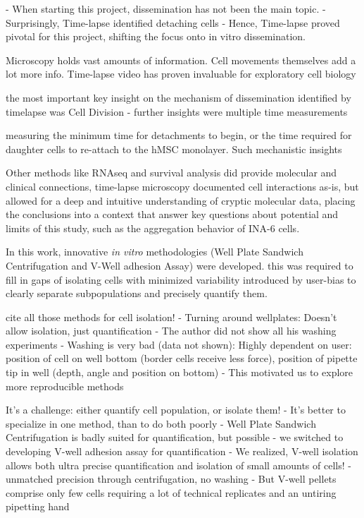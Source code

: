 - When starting this project, dissemination has not been the main topic.
- Surprisingly, Time-lapse identified detaching cells
- Hence, Time-lapse proved pivotal for this project, shifting the focus
onto in vitro dissemination.


Microscopy holds vast amounts of information.
Cell movements themselves add a lot more info. Time-lapse video
has proven invaluable for exploratory cell biology

the most important key insight on the mechanism of dissemination identified by
timelapse was Cell Division
- further insights were multiple time measurements

measuring the minimum time
for detachments to begin, or the time required for daughter cells to re-attach
to the hMSC monolayer. Such mechanistic insights


Other methods like RNAseq and survival analysis did provide molecular and
clinical connections, time-lapse microscopy documented cell interactions as-is,
but allowed for a deep and intuitive understanding of cryptic molecular data,
placing the conclusions into a context that answer key questions about potential
and limits of this study, such as the aggregation behavior of INA-6 cells.


%
\label{sec:discussion_novel_methods}%

In this work, innovative \textit{in vitro} methodologies (Well Plate Sandwich
Centrifugation and V-Well adhesion Assay) were developed. this was required to
fill in gaps of isolating cells with minimized variability introduced by
user-bias to clearly separate subpopulations and precisely quantify them.


cite all those methods for cell isolation!
- Turning around wellplates: Doesn't allow isolation, just quantification
- The author did not show all his washing experiments
- Washing is very bad (data not shown): Highly dependent on user:
position of cell on well bottom (border cells receive less force), position of
pipette tip in well (depth, angle and position on bottom)
- This motivated us to explore more reproducible methods

It's a challenge: either quantify cell population, or isolate them!
- It's better to specialize in one method, than to do both poorly
- Well Plate Sandwich Centrifugation is badly suited for quantification, but possible
- we switched to developing V-well adhesion assay for quantification
- We realized, V-well isolation allows both ultra precise quantification and
isolation of small amounts of cells!
- unmatched precision through centrifugation, no washing
- But V-well pellets comprise only few cells requiring a lot of technical
replicates and an untiring pipetting hand %


